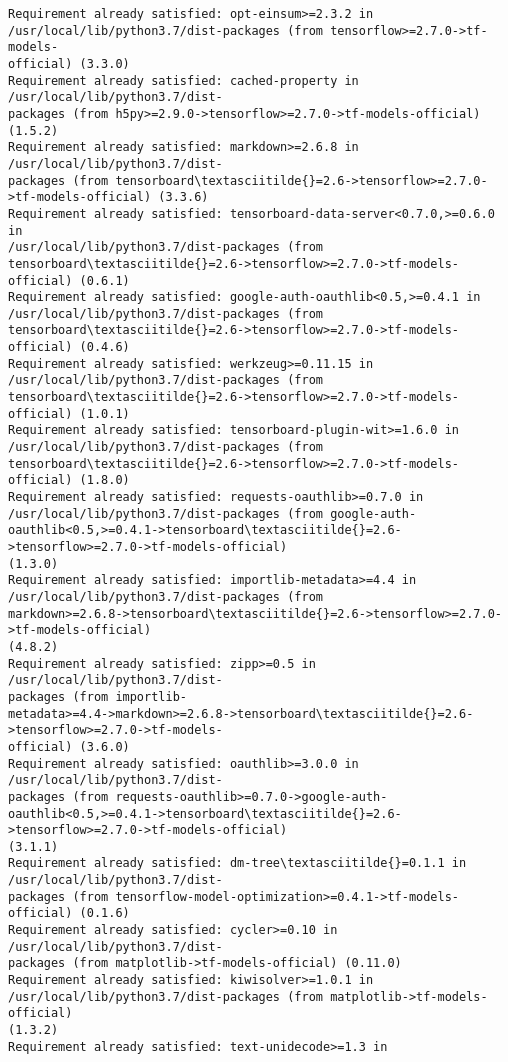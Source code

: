 \documentclass[11pt]{article}
\begin{document}
\begin{Verbatim}[commandchars=\\\{\}]
Requirement already satisfied: opt-einsum>=2.3.2 in
/usr/local/lib/python3.7/dist-packages (from tensorflow>=2.7.0->tf-models-
official) (3.3.0)
Requirement already satisfied: cached-property in /usr/local/lib/python3.7/dist-
packages (from h5py>=2.9.0->tensorflow>=2.7.0->tf-models-official) (1.5.2)
Requirement already satisfied: markdown>=2.6.8 in /usr/local/lib/python3.7/dist-
packages (from tensorboard\textasciitilde{}=2.6->tensorflow>=2.7.0->tf-models-official) (3.3.6)
Requirement already satisfied: tensorboard-data-server<0.7.0,>=0.6.0 in
/usr/local/lib/python3.7/dist-packages (from
tensorboard\textasciitilde{}=2.6->tensorflow>=2.7.0->tf-models-official) (0.6.1)
Requirement already satisfied: google-auth-oauthlib<0.5,>=0.4.1 in
/usr/local/lib/python3.7/dist-packages (from
tensorboard\textasciitilde{}=2.6->tensorflow>=2.7.0->tf-models-official) (0.4.6)
Requirement already satisfied: werkzeug>=0.11.15 in
/usr/local/lib/python3.7/dist-packages (from
tensorboard\textasciitilde{}=2.6->tensorflow>=2.7.0->tf-models-official) (1.0.1)
Requirement already satisfied: tensorboard-plugin-wit>=1.6.0 in
/usr/local/lib/python3.7/dist-packages (from
tensorboard\textasciitilde{}=2.6->tensorflow>=2.7.0->tf-models-official) (1.8.0)
Requirement already satisfied: requests-oauthlib>=0.7.0 in
/usr/local/lib/python3.7/dist-packages (from google-auth-
oauthlib<0.5,>=0.4.1->tensorboard\textasciitilde{}=2.6->tensorflow>=2.7.0->tf-models-official)
(1.3.0)
Requirement already satisfied: importlib-metadata>=4.4 in
/usr/local/lib/python3.7/dist-packages (from
markdown>=2.6.8->tensorboard\textasciitilde{}=2.6->tensorflow>=2.7.0->tf-models-official)
(4.8.2)
Requirement already satisfied: zipp>=0.5 in /usr/local/lib/python3.7/dist-
packages (from importlib-
metadata>=4.4->markdown>=2.6.8->tensorboard\textasciitilde{}=2.6->tensorflow>=2.7.0->tf-models-
official) (3.6.0)
Requirement already satisfied: oauthlib>=3.0.0 in /usr/local/lib/python3.7/dist-
packages (from requests-oauthlib>=0.7.0->google-auth-
oauthlib<0.5,>=0.4.1->tensorboard\textasciitilde{}=2.6->tensorflow>=2.7.0->tf-models-official)
(3.1.1)
Requirement already satisfied: dm-tree\textasciitilde{}=0.1.1 in /usr/local/lib/python3.7/dist-
packages (from tensorflow-model-optimization>=0.4.1->tf-models-official) (0.1.6)
Requirement already satisfied: cycler>=0.10 in /usr/local/lib/python3.7/dist-
packages (from matplotlib->tf-models-official) (0.11.0)
Requirement already satisfied: kiwisolver>=1.0.1 in
/usr/local/lib/python3.7/dist-packages (from matplotlib->tf-models-official)
(1.3.2)
Requirement already satisfied: text-unidecode>=1.3 in

\end{Verbatim}
\end{document}
